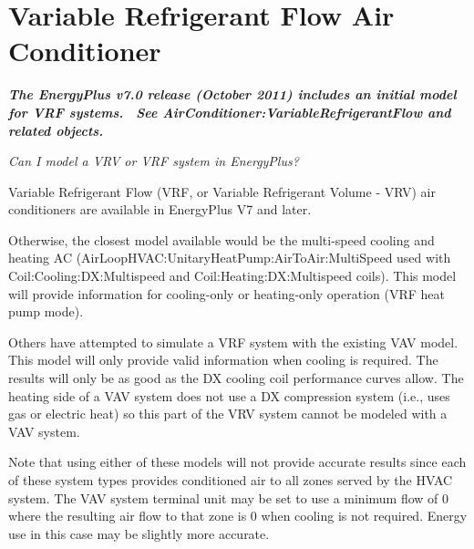 \section{Variable Refrigerant Flow Air Conditioner}\label{variable-refrigerant-flow-air-conditioner}

\textbf{\emph{The EnergyPlus v7.0 release (October 2011) includes an initial model for VRF systems.~ See AirConditioner:VariableRefrigerantFlow and related objects.}}

\emph{Can I model a VRV or VRF system in EnergyPlus?}

Variable Refrigerant Flow (VRF, or Variable Refrigerant Volume - VRV) air conditioners are available in EnergyPlus V7 and later.

Otherwise, the closest model available would be the multi-speed cooling and heating AC (AirLoopHVAC:UnitaryHeatPump:AirToAir:MultiSpeed used with Coil:Cooling:DX:Multispeed and Coil:Heating:DX:Multispeed coils). This model will provide information for cooling-only or heating-only operation (VRF heat pump mode).

Others have attempted to simulate a VRF system with the existing VAV model. This model will only provide valid information when cooling is required. The results will only be as good as the DX cooling coil performance curves allow. The heating side of a VAV system does not use a DX compression system (i.e., uses gas or electric heat) so this part of the VRV system cannot be modeled with a VAV system.

Note that using either of these models will not provide accurate results since each of these system types provides conditioned air to all zones served by the HVAC system. The VAV system terminal unit may be set to use a minimum flow of 0 where the resulting air flow to that zone is 0 when cooling is not required. Energy use in this case may be slightly more accurate.

